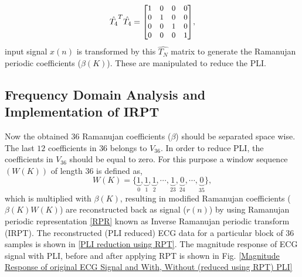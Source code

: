 \documentclass[conference]{IEEEtran}
\begin{document}
\begin{equation}
\small{{\hat{T_4}}^{T}{\hat{T_4}}=
\begin{bmatrix}
1 & 0 & 0 & 0\\
0 & 1 & 0 & 0 \\
0 & 0 & 1 & 0\\
0 & 0 & 0 & 1
\end{bmatrix}},
\end{equation} 
input signal $x(n)$ is transformed by this $\hat{T_N}$ matrix to generate the Ramanujan periodic coefficients ($\beta(K)$). These are manipulated to reduce the PLI.

\subsection{Frequency Domain Analysis and Implementation of IRPT}
Now the obtained $36$ Ramanujan coefficients ($\beta$) should be separated space wise.
The last $12$ coefficients in $36$ belongs to $V_{36}$. In order to reduce PLI, the coefficients in $V_{36}$ should be equal to zero.  For this purpose a window sequence $(W(K))$ of length $36$ is defined as,
\begin{equation}
\label{window}
W(K) = \{\underbrace{1}_{0},\underbrace{1}_{1},\underbrace{1}_{2},\cdots,\underbrace{1}_{23},\underbrace{0}_{24},\cdots,\underbrace{0}_{35}\},
\end{equation}
which is multiplied with  $\beta(K)$, resulting in modified Ramanujan coefficients (${\beta(K)}W(K)$) are reconstructed back as signal ($r(n)$) by using  Ramanujan periodic representation  \eqref{RPR} known as Inverse Ramanujan periodic transform (IRPT). The reconstructed (PLI reduced) ECG data for a particular block of $36$ samples is shown in 
\ref{PLI reduction using RPT}. The magnitude response of ECG signal with PLI, before and after applying RPT is shown in Fig. \ref{Magnitude Response of original ECG Signal and With, Without (reduced using RPT) PLI} 
\end{document}

